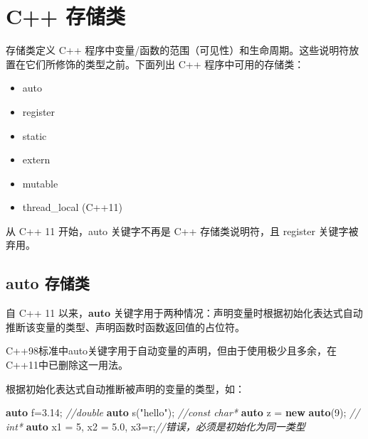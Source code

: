 \documentclass[
]{article}
\newenvironment{Shaded}{}{}
\newcommand{\CharTok}[1]{\textcolor[rgb]{0.25,0.44,0.63}{#1}}
\newcommand{\CommentTok}[1]{\textcolor[rgb]{0.38,0.63,0.69}{\textit{#1}}}
\newcommand{\DecValTok}[1]{\textcolor[rgb]{0.25,0.63,0.44}{#1}}
\newcommand{\FloatTok}[1]{\textcolor[rgb]{0.25,0.63,0.44}{#1}}
\newcommand{\KeywordTok}[1]{\textcolor[rgb]{0.00,0.44,0.13}{\textbf{#1}}}
\newcommand{\NormalTok}[1]{#1}
\newcommand{\OperatorTok}[1]{\textcolor[rgb]{0.40,0.40,0.40}{#1}}
\newcommand{\StringTok}[1]{\textcolor[rgb]{0.25,0.44,0.63}{#1}}
\providecommand{\tightlist}{%
  \setlength{\itemsep}{0pt}\setlength{\parskip}{0pt}}
\begin{document}
\hypertarget{c-ux5b58ux50a8ux7c7b}{%
\section{C++ 存储类}\label{c-ux5b58ux50a8ux7c7b}}

存储类定义 C++
程序中变量/函数的范围（可见性）和生命周期。这些说明符放置在它们所修饰的类型之前。下面列出
C++ 程序中可用的存储类：

\begin{itemize}
\tightlist
\item
  auto
\item
  register
\item
  static
\item
  extern
\item
  mutable
\item
  thread\_local (C++11)
\end{itemize}

从 C++ 11 开始，auto 关键字不再是 C++ 存储类说明符，且 register
关键字被弃用。

\hypertarget{auto-ux5b58ux50a8ux7c7b}{%
\subsection{auto 存储类}\label{auto-ux5b58ux50a8ux7c7b}}

自 C++ 11 以来，\textbf{auto}
关键字用于两种情况：声明变量时根据初始化表达式自动推断该变量的类型、声明函数时函数返回值的占位符。

C++98标准中auto关键字用于自动变量的声明，但由于使用极少且多余，在C++11中已删除这一用法。

根据初始化表达式自动推断被声明的变量的类型，如：

\begin{Shaded}
\begin{Highlighting}[]
\KeywordTok{auto}\NormalTok{ f}\OperatorTok{=}\FloatTok{3.14}\OperatorTok{;}    \CommentTok{//double }
\KeywordTok{auto}\NormalTok{ s}\OperatorTok{(}\StringTok{"hello"}\OperatorTok{);}  \CommentTok{//const char*}
\KeywordTok{auto}\NormalTok{ z }\OperatorTok{=} \KeywordTok{new} \KeywordTok{auto}\OperatorTok{(}\DecValTok{9}\OperatorTok{);} \CommentTok{// int*}
\KeywordTok{auto}\NormalTok{ x1 }\OperatorTok{=} \DecValTok{5}\OperatorTok{,}\NormalTok{ x2 }\OperatorTok{=} \FloatTok{5.0}\OperatorTok{,}\NormalTok{ x3}\OperatorTok{=}\CharTok{\textquotesingle{}r\textquotesingle{}}\OperatorTok{;}\CommentTok{//错误，必须是初始化为同一类型}
\end{Highlighting}
\end{Shaded}
\end{document}
